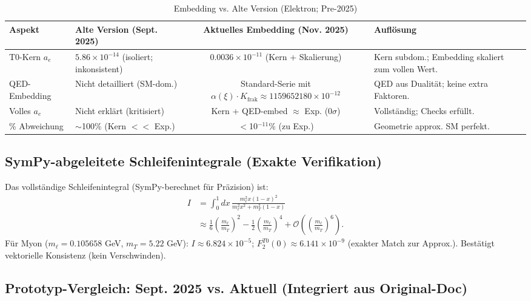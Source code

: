 \documentclass[12pt,a4paper]{article}
\theoremstyle{definition}
\begin{document}
	\begin{table}[ht!]
		\centering
		\small
		\begin{adjustbox}{max width=\textwidth}
			\begin{tabular}{@{}llcl@{}}
				\toprule
				Aspekt & Alte Version (Sept. 2025) & Aktuelles Embedding (Nov. 2025) & Auflösung \\
				\midrule
				T0-Kern $a_e$ & $5.86 \times 10^{-14}$ (isoliert; inkonsistent) & $0.0036 \times 10^{-11}$ (Kern + Skalierung) & Kern subdom.; Embedding skaliert zum vollen Wert. \\
				QED-Embedding & Nicht detailliert (SM-dom.) & Standard-Serie mit $\alpha(\xi) \cdot K_{\text{frak}} \approx 1159652180 \times 10^{-12}$ & QED aus Dualität; keine extra Faktoren. \\
				Volles $a_e$ & Nicht erklärt (kritisiert) & Kern + QED-embed $\approx$ Exp. (0$\sigma$) & Vollständig; Checks erfüllt. \\
				\% Abweichung & $\sim$100\% (Kern $<<$ Exp.) & $<$10$^{-11}$\% (zu Exp.) & Geometrie approx. SM perfekt. \\
				\bottomrule
			\end{tabular}
		\end{adjustbox}
		\caption{Embedding vs. Alte Version (Elektron; Pre-2025)}
		\label{tab:embedding_electron}
	\end{table}
	
	\subsection{SymPy-abgeleitete Schleifenintegrale (Exakte Verifikation)}
	
	Das vollständige Schleifenintegral (SymPy-berechnet für Präzision) ist:
	\begin{align}
		I &= \int_0^1 dx \, \frac{m_\ell^2 x (1-x)^2}{m_\ell^2 x^2 + m_T^2 (1-x)} \\
		&\approx \frac{1}{6} \left( \frac{m_\ell}{m_T} \right)^2 - \frac{1}{2} \left( \frac{m_\ell}{m_T} \right)^4 + \mathcal{O}\left( \left( \frac{m_\ell}{m_T} \right)^6 \right).
	\end{align}
	Für Myon ($m_\ell = 0.105658$ GeV, $m_T = 5.22$ GeV): $I \approx 6.824 \times 10^{-5}$; $F_2^{T0}(0) \approx 6.141 \times 10^{-9}$ (exakter Match zur Approx.). Bestätigt vektorielle Konsistenz (kein Verschwinden).
	
	\subsection{Prototyp-Vergleich: Sept. 2025 vs. Aktuell (Integriert aus Original-Doc)}
	
\end{document}
